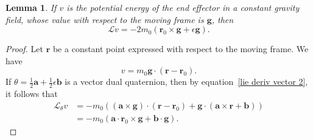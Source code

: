 \documentclass[reqno,12pt]{amsart}
\newcommand{\liederiv}{\mathcal L}
\newtheorem{lemma}{Lemma}
\begin{document}

\begin{lemma}
\label{lambda pot energy}
If $v$ is the potential energy of the end effector in a constant gravity field, whose value with respect to the moving frame is $\bm g$, then
\begin{equation}
\liederiv v = - 2 m_0 (\bm r_0 \times \bm g + \epsilon \bm g) .
\end{equation}
\end{lemma}

\begin{proof}  Let $\bm r$ be a constant point expressed with respect to the moving frame.  We have
\begin{equation}
v = m_0 \bm g \cdot (\bm r - \bm r_0) .
\end{equation}
If $\theta = \tfrac12\bm a + \tfrac12 \epsilon \bm b$ is a vector dual quaternion, then by equation~\eqref{lie deriv vector 2}, it follows that
\begin{equation}
\begin{aligned}
\mathcal L_\theta v &= - m_0 ((\bm a \times \bm g) \cdot (\bm r - \bm r_0) + \bm g \cdot (\bm a \times \bm r + \bm b)) \\
&= -m_0 (\bm a \cdot \bm r_0 \times \bm g + \bm b \cdot \bm g ) .
\end{aligned}
\end{equation}
\end{proof}
\end{document}
